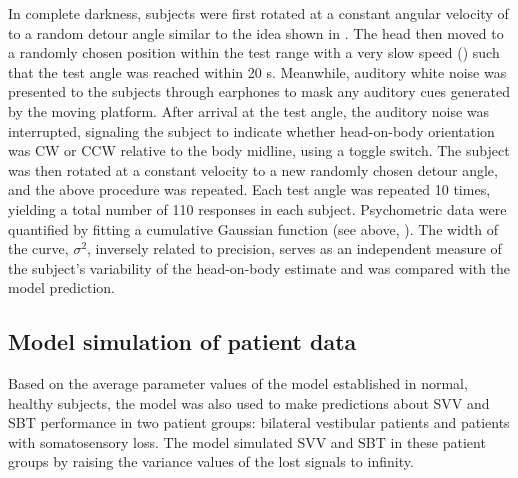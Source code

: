 In complete darkness, subjects were first rotated at a constant angular velocity of  to a random detour angle similar to the idea shown in . The head then moved to a randomly chosen position within the test range with a very slow speed () such that the test angle was reached within 20 \si{\second}. Meanwhile, auditory white noise was presented to the subjects through earphones to mask any auditory cues generated by the moving platform. After arrival at the test angle, the auditory noise was interrupted, signaling the subject to indicate whether head-on-body orientation was CW or CCW relative to the body midline, using a toggle switch. The subject was then rotated at a constant velocity to a new randomly chosen detour angle, and the above procedure was repeated. Each test angle was repeated 10 times, yielding a total number of 110 responses in each subject. Psychometric data were quantified by fitting a cumulative Gaussian function (see above, ). The width of the curve, $\sigma^2$, inversely related to precision, serves as an independent measure of the subject's variability of the head-on-body estimate and was compared with the model prediction. 

\subsection{Model simulation of patient data}

Based on the average parameter values of the model established in normal, healthy subjects, the model was also used to make predictions about SVV and SBT performance in two patient groups: bilateral vestibular patients and patients with somatosensory loss. The model simulated SVV and SBT in these patient groups by raising the variance values of the lost signals to infinity. 